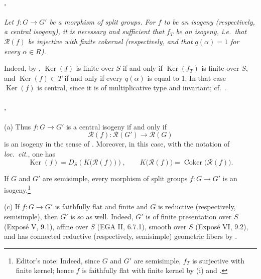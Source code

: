 \paragraph{.}
\textit{Let \(f:G\to G'\) be a morphism of split groups. For \(f\)
to be an isogeny \textup{(respectively, a central isogeny)}, it is
necessary and sufficient that \(f_T\) be an isogeny, i.e.\ that
\(\mathscr R(f)\) be injective with finite cokernel
\textup{(respectively, and that \(q(\alpha)=1\) for every
\(\alpha\in R\))}.}

Indeed, by , \(\operatorname{Ker}(f)\) is finite over \(S\)
if and only if \(\operatorname{Ker}(f_T)\) is finite over \(S\),
and \(\operatorname{Ker}(f)\subset T\) if and only if every
\(q(\alpha)\) is equal to \(1\). In that case
\(\operatorname{Ker}(f)\) is central, since it is of multiplicative
type and invariant; cf.\ .

\paragraph{.}
\textup{(a)} Thus \(f:G\to G'\) is a central isogeny if and only if
\[
  \mathscr R(f):\mathscr R(G')\longrightarrow\mathscr R(G)
\]
is an isogeny in the sense of . Moreover, in this
case, with the notation of \emph{loc.\ cit.}, one has
\[
  \operatorname{Ker}(f)
  =
  D_S\!\left(K\bigl(\mathscr R(f)\bigr)\right),
  \qquad
  K\bigl(\mathscr R(f)\bigr)
  =
  \operatorname{Coker}\bigl(\mathscr R(f)\bigr).
\]

\textup{} If \(G\) and \(G'\) are semisimple, every morphism of
split groups \(f:G\to G'\) is an isogeny.\footnote{Editor's note:
Indeed, since \(G\) and \(G'\) are semisimple, \(f_T\) is
surjective with finite kernel; hence \(f\) is faithfully flat with
finite kernel by \textup{(i)} and .}

\textup{(c)} If \(f:G\to G'\) is faithfully flat and finite and
\(G\) is reductive \textup{(respectively, semisimple)}, then \(G'\)
is so as well. Indeed, \(G'\) is of finite presentation over \(S\)
\textup{(Exposé V, 9.1)}, affine over \(S\)
\textup{(EGA II, 6.7.1)}, smooth over \(S\)
\textup{(Exposé VI, 9.2)}, and has connected reductive
\textup{(respectively, semisimple)} geometric fibers by .

